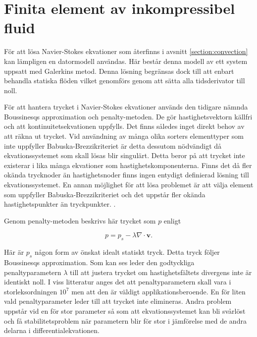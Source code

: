 \section{Finita element av inkompressibel fluid}
\label{sec:femconvection}
För att lösa Navier-Stokes ekvationer som återfinns i avsnitt
\ref{section:convection} kan lämpligen en datormodell användas.
Här består denna modell av ett system uppsatt med Galerkins metod.
Denna lösning begränsas dock till att enbart behandla statiska flöden
vilket genomförs genom att sätta alla tidsderivator till noll.

För att hantera trycket i Navier-Stokes ekvationer
används den tidigare nämnda Boussinesqs approximation
och penalty-metoden. De gör hastighetsvektorn källfri och att
kontinuitetsekvationen uppfylls. Det finns således inget direkt behov av att räkna ut trycket.
Vid användning av många olika sorters elementtyper som inte uppfyller Babuska-Brezzikriteriet
är detta dessutom nödvändigt då ekvationssystemet som skall lösas blir singulärt. 
Detta beror på att trycket inte existerar i lika många ekvationer som hastighetskomponenterna.
Finns det då fler okända trycknoder än hastighetsnoder finns ingen entydigt definierad lösning
till ekvationssystemet. En annan möjlighet för att lösa problemet är att välja element som
uppfyller Babuska-Brezzikriteriet och det uppstår fler okända hastighetspunkter än tryckpunkter. \emph{\color{red}{Är tryckpunkter och trycknoder samma sak?}}.
\cite{babuska1973}\cite{segal2011}

Genom penalty-metoden beskrivs här trycket som $p$ enligt 

\begin{equation}
\label{eq:femconvection:penalty}
p = p_s - \lambda\nabla\cdot\mathbf{v}.
\end{equation}

Här är $p_s$ någon form av önskat idealt statiskt
tryck. Detta tryck följer Boussinesqs approximation.
\cite{heinrich88}\cite{taylor79}
Som kan ses leder den godtyckliga penaltyparametern $\lambda$ till att justera trycket
om hastighetsfältets divergens inte är identiskt noll. I viss litteratur anges 
det att penaltyparametern skall vara i storleksordningen $10^7$ men att den
är väldigt applikationsberoende. En för liten vald penaltyparameter leder till att
trycket inte elimineras. Andra problem uppstår vid en för stor parameter så som att ekvationssystemet
kan bli svårlöst och få stabilitetsproblem när parametern blir
för stor i jämförelse med de andra delarna i differentialekvationen.\cite{reddy93}\cite{roy05}\cite{basak04}\cite{segal2011}

